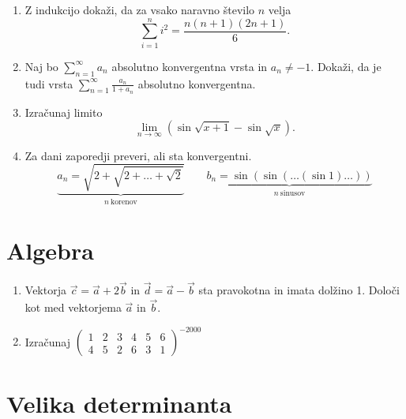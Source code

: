 \documentclass[a4paper,12pt]{article}
\begin{document}
\begin{enumerate}
\item
Z indukcijo dokaži, da za vsako naravno število \(n\) velja
\[
\sum_{i=1}^{n} i^2 = \frac{n(n+1)(2n + 1)}{6}.
\]

\item
Naj bo \(\sum_{n=1}^{\infty} a_n\) absolutno konvergentna vrsta in \(a_n \ne -1\).
Dokaži, da je tudi vrsta \(\sum_{n=1}^\infty \frac{a_n}{1+a_n}\)
absolutno konvergentna.

\item
Izračunaj limito
\[
\lim \limits_{n \to \infty} (\sin \sqrt{x + 1} - \sin \sqrt{x}).
\]

\item
Za dani zaporedji preveri, ali sta konvergentni.
\[
\underbrace{a_n = \sqrt{2+\sqrt{2+\dots+\sqrt{2}}}}_{n~\text{korenov}} \qquad
\underbrace{b_n = \sin(\sin(\dots(\sin 1)\dots))}_{n~\text{sinusov}}
\]

\end{enumerate}

\section*{Algebra}

\begin{enumerate}
\item
Vektorja \(\vec{c} = \vec{a} + 2 \vec{b}\) in \(\vec{d} = \vec{a} - \vec{b}\)
sta pravokotna in imata dolžino 1. Določi kot med vektorjema \(\vec{a}\) in \(\vec{b}\).

\item
Izračunaj
\(
\begin{pmatrix}
1 & 2 & 3 & 4 & 5 & 6 \\
4 & 5 & 2 & 6 & 3 & 1
\end{pmatrix}^{-2000}
\)
\end{enumerate}

\section*{Velika determinanta}
\end{document}
